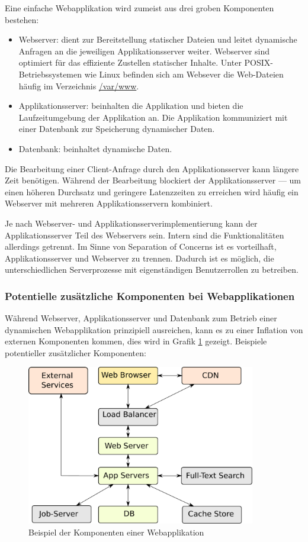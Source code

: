 Eine einfache Webapplikation wird zumeist aus drei groben Komponenten bestehen:

\begin{itemize}
	\item Webserver: dient zur Bereitstellung statischer Dateien und leitet dynamische Anfragen an die jeweiligen Applikationsserver weiter. Webserver sind optimiert für das effiziente Zustellen statischer Inhalte. Unter POSIX-Betriebssystemen wie Linux befinden sich am Websever die Web-Dateien häufig im Verzeichnis \url{/var/www}.
	\item Applikationsserver: beinhalten die Applikation und bieten die Laufzeitumgebung der Applikation an. Die Applikation kommuniziert mit einer Datenbank zur Speicherung dynamischer Daten.
	\item Datenbank: beinhaltet dynamische Daten.
\end{itemize}

Die Bearbeitung einer Client-Anfrage durch den Applikationsserver kann längere Zeit benötigen. Während der Bearbeitung blockiert der Applikationsserver --- um einen höheren Durchsatz und geringere Latenzzeiten zu erreichen wird häufig ein Webserver mit mehreren Applikationsservern kombiniert.

Je nach Webserver- und Applikationsserverimplementierung kann der Applikationsserver Teil des Webservers sein. Intern sind die Funktionalitäten allerdings getrennt. Im Sinne von Separation of Concerns ist es vorteilhaft, Applikationsserver und Webserver zu trennen. Dadurch ist es möglich, die unterschiedlichen Serverprozesse mit eigenständigen Benutzerrollen zu betreiben.

\subsubsection{Potentielle zusätzliche Komponenten bei Webapplikationen}

Während Webserver, Applikationsserver und Datenbank zum Betrieb einer dynamischen Webapplikation prinzipiell ausreichen, kann es zu einer Inflation von externen Komponenten kommen, dies wird in Grafik \ref{component_inflation} gezeigt. Beispiele potentieller zusätzlicher Komponenten:

\begin{figure}[h!]
\includegraphics[width=10cm]{images/web_components.pdf}
\centering
\caption{Beispiel der Komponenten einer Webapplikation}
\label{component_inflation}
\end{figure}

